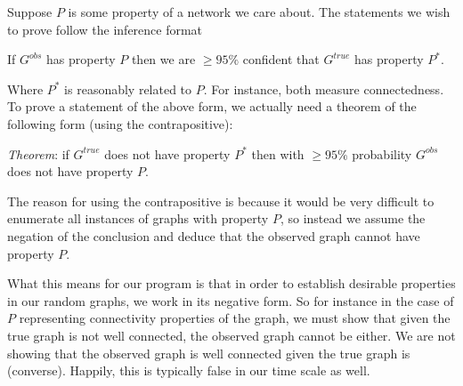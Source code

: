 Suppose $P$ is some property of a network we care about.  The statements we wish to prove follow the inference format 
\begin{center}
If $G^{obs}$ has property $P$ then we are $\geq 95\%$ confident that $G^{true}$ has property $P^*$.
\end{center}

Where $P^*$ is reasonably related to $P$.  For instance, both measure connectedness.  To prove a statement of the above form, we actually need a theorem of the following form (using the contrapositive):

\begin{center}
\textit{Theorem}: if $G^{true}$ does not have property $P^*$ then with $\geq 95\%$ probability $G^{obs}$ does not have property $P$.  
\end{center}

The reason for using the contrapositive is because it would be very difficult to enumerate all instances of graphs with property $P$, so instead we assume the negation of the conclusion and deduce that the observed graph cannot have property $P$.  

What this means for our program is that in order to establish desirable properties in our random graphs, we work in its negative form.  So for instance in the case of $P$ representing connectivity properties of the graph, we must show that given the true graph is not well connected, the observed graph cannot be either.  We are not showing that the observed graph is well connected given the true graph is (converse).  Happily, this is typically false in our time scale as well.  
